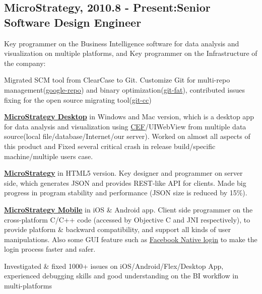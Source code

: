 \documentclass[letterpaper]{article}
\renewenvironment{itemize}{
\begin{list}{*}{
    \setlength{\leftmargin}{1.5em}
    \setlength{\itemsep}{0pt}
  }
}{
  \end{list}
}
\begin{document}
\subsection*{\textbf{MicroStrategy, 2010.8 - Present:\hfill Senior Software Design Engineer}}
\begin{itemize}
\item Key programmer on the Business Intelligence software for data analysis and visualization on multiple platforms, and Key programmer on the Infrastructure of the company:
\item Migrated SCM tool from ClearCase to Git. Customize Git for multi-repo management(\href{https://source.android.com/source/using-repo.html}{google-repo}) and binary optimization(\href{https://github.com/cyaninc/git-fat}{git-fat}), contributed issues fixing for the open source migrating tool(\href{https://github.com/charleso/git-cc/issues/57}{git-cc}) 
\item \href{http://www.microstrategy.com/us/analytics/desktop}{\textbf{MicroStrategy Desktop}} in Windows and Mac version, which is a desktop app for data analysis and visualization using \href{https://bitbucket.org/chromiumembedded/cef}{CEF}/UIWebView from multiple data source(local file/database/Internet/our server). Worked on almost all aspects of this product and Fixed several critical crash in release build/specific machine/multiple users case.
\item \href{http://www.microstrategy.com/us/analytics}{\textbf{MicroStrategy}} in HTML5 version. Key designer and programmer on server side, which generates JSON and provides REST-like API for clients. Made big progress in program stability and performance (JSON size is reduced by 15\%).
\item \href{http://www.microstrategy.com/us/mobile}{\textbf{MicroStrategy Mobile}} in iOS \& Android app. Client side programmer on the cross-platform C/C++ code (accessed by Objective C and JNI respectively), to provide platform \& backward compatibility, and support all kinds of user manipulations. Also some GUI feature such as \href{https://developers.facebook.com/docs/facebook-login/ios/}{Facebook Native login} to make the login process faster and safer.
\item Investigated \& fixed 1000+ issues on iOS/Android/Flex/Desktop App, experienced debugging skills and good understanding on the BI workflow in multi-platforms  
\end{itemize}
\end{document}
